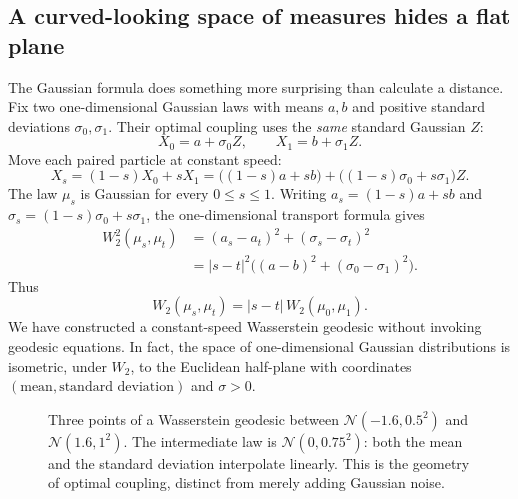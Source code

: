 \subsection*{A curved-looking space of measures hides a flat plane}

The Gaussian formula does something more surprising than calculate a distance. Fix two one-dimensional Gaussian laws with means $a,b$ and positive standard deviations $\sigma_0,\sigma_1$. Their optimal coupling uses the \emph{same} standard Gaussian $Z$:
\[
 X_0=a+\sigma_0Z,\qquad X_1=b+\sigma_1Z.
\]
Move each paired particle at constant speed:
\[
 X_s=(1-s)X_0+sX_1
 =\bigl((1-s)a+sb\bigr)
    +\bigl((1-s)\sigma_0+s\sigma_1\bigr)Z.
\]
The law $\mu_s$ is Gaussian for every $0\le s\le1$. Writing $a_s=(1-s)a+sb$ and $\sigma_s=(1-s)\sigma_0+s\sigma_1$, the one-dimensional transport formula gives
\[
\begin{aligned}
 W_2^2(\mu_s,\mu_t)
 &=(a_s-a_t)^2+(\sigma_s-\sigma_t)^2\\
 &=|s-t|^2\bigl((a-b)^2+(\sigma_0-\sigma_1)^2\bigr).
\end{aligned}
\]
Thus
\[
 \boxed{W_2(\mu_s,\mu_t)=|s-t|\,W_2(\mu_0,\mu_1).}
\]
We have constructed a constant-speed Wasserstein geodesic without invoking geodesic equations. In fact, the space of one-dimensional Gaussian distributions is isometric, under $W_2$, to the Euclidean half-plane with coordinates $(\text{mean},\text{standard deviation})$ and $\sigma>0$.

\begin{figure}[H]
\centering
{}
\caption{Three points of a Wasserstein geodesic between $\mathcal N(-1.6,0.5^2)$ and $\mathcal N(1.6,1^2)$. The intermediate law is $\mathcal N(0,0.75^2)$: both the mean and the standard deviation interpolate linearly. This is the geometry of optimal coupling, distinct from merely adding Gaussian noise.}
\end{figure}

